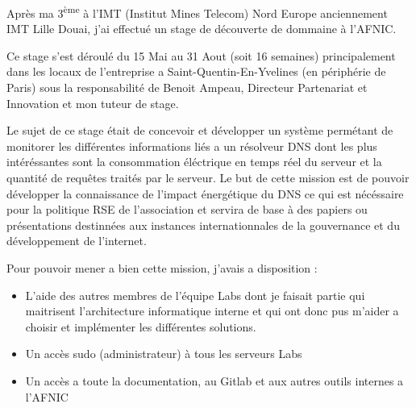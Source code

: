Après ma 3\textsuperscript{ème} à l'IMT (Institut Mines Telecom) Nord Europe anciennement IMT Lille Douai, j'ai effectué un stage de découverte de dommaine à l'AFNIC.

Ce stage s'est déroulé du 15 Mai au 31 Aout (soit 16 semaines) principalement dans les locaux de l'entreprise a Saint-Quentin-En-Yvelines (en périphérie de Paris) sous la responsabilité de Benoit Ampeau, Directeur Partenariat et Innovation et mon tuteur de stage.

Le sujet de ce stage était de concevoir et développer un système permétant de monitorer les différentes informations liés a un résolveur DNS dont les plus intéréssantes sont la consommation éléctrique en temps réel du serveur et la quantité de requêtes traités par le serveur.
Le but de cette mission est de pouvoir développer la connaissance de l'impact énergétique du DNS ce qui est nécéssaire pour la politique RSE de l'association et servira de base à des papiers ou présentations destinnées aux instances internationnales de la gouvernance et du développement de l'internet.

Pour pouvoir mener a bien cette mission, j'avais a disposition :
\begin{itemize}
    \item L'aide des autres membres de l'équipe Labs dont je faisait partie qui maitrisent l'architecture informatique interne et qui ont donc pus m'aider a choisir et implémenter les différentes solutions.
    \item Un accès sudo (administrateur) à tous les serveurs Labs
    \item Un accès a toute la documentation, au Gitlab et aux autres outils internes a l'AFNIC
\end{itemize}

